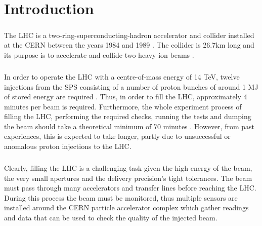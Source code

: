 \chapter{Introduction}

\paragraph{ }The \ac{LHC} is a two-ring-superconducting-hadron accelerator and collider installed at the \ac{CERN} between the years 1984 and 1989 \cite{Evans2008}. The collider is 26.7km long and its purpose is to accelerate and collide two heavy ion beams \cite{Valentino2017}.

\paragraph{ }In order to operate the \acs{LHC} with a centre-of-mass energy of 14 \ac{TeV}, twelve injections from the \ac{SPS} consisting of a number of proton bunches of around 1 \ac{MJ} of stored energy are required \cite{Drosdal2011}. Thus, in order to fill the \acs{LHC}, approximately 4 minutes per beam is required. Furthermore, the whole experiment process of filling the LHC, performing the required checks, running the tests and dumping the beam should take a theoretical minimum of 70 minutes \cite{Evans2008}. However, from past experiences, this is expected to take longer, partly due to unsuccessful or anomalous proton injections to the \acs{LHC}. 

\paragraph{ }Clearly, filling the \acs{LHC} is a challenging task given the high energy of the beam, the very small apertures and the delivery precision's tight tolerances. The beam must pass through many accelerators and transfer lines before reaching the \acs{LHC}. During this process the beam must be monitored, thus multiple sensors are installed around the \acs{CERN} particle accelerator complex \cite{Lefevre2008} which gather readings and data that can be used to check the quality of the injected beam. 

